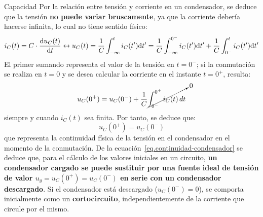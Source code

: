 \documentclass[11pt]{book} %
\makeatletter
\numberwithin{dummy}{section}
\theoremstyle{ocrenumbox}
\theoremstyle{blacknumex}
\theoremstyle{blacknumbox}
\theoremstyle{ocrenum}
\renewcommand{\subsection}{\@startsection {subsection}{2}{\z@}
{-3ex \@plus -0.1ex \@minus -.4ex}
{0.5ex \@plus.2ex }
{\normalfont\sffamily\bfseries}}
\makeatother
\begin{document}
	
	\subsection{Capacidad}
	Por la relación entre tensión y corriente en un condensador, se deduce que la tensión \textbf{no puede variar bruscamente}, ya que la corriente debería hacerse infinita, lo cual no tiene sentido físico:
	\begin{equation*}
		i_C(t) = C \cdot \diff{u_C(t)}{t}
\leftrightarrow
u_C(t) = \frac{1}{C} \int^t_{-\infty}i_C(t') \mathrm{d}t'= \frac{1}{C} \int^{0^-}_{-\infty}i_C(t')\mathrm{d}t' + \frac{1}{C} \int^{t}_{0^-}i_C(t')\mathrm{d}t'
	\end{equation*}
	El primer sumando representa el valor de la tensión en $t=0^-$; si la conmutación se realiza en $t=0$ y se desea calcular la corriente en el instante $t=0^+$, resulta:
	\begin{equation*}
		u_C(0^+)=u_C(0^-)+ \dfrac{1}{C}\cancelto{0}{\int_{0^-}^{0^+} i_C(t)\, dt}
	\end{equation*}
	siempre y cuando $i_C(t)$ sea finita. Por tanto, se deduce que:
	\begin{equation}\label{eq.continuidad-condensador}
		\boxed{u_C(0^+)=u_C(0^-)}
	\end{equation}
	que representa la continuidad física de la tensión en el condensador en el momento de la conmutación. De la ecuación~\eqref{eq.continuidad-condensador} se deduce que, para el cálculo de los valores iniciales en un circuito, \textbf{un condensador cargado se puede sustituir por una fuente ideal de tensión de valor $u_g=u_C(0^+)=u_C(0^-)$ en serie con un condensador descargado}. Si el condensador está descargado ($u_C(0^-)=0$), se comporta inicialmente como un \textbf{cortocircuito}, independientemente de la corriente que circule por el mismo.
	
	
\end{document}
